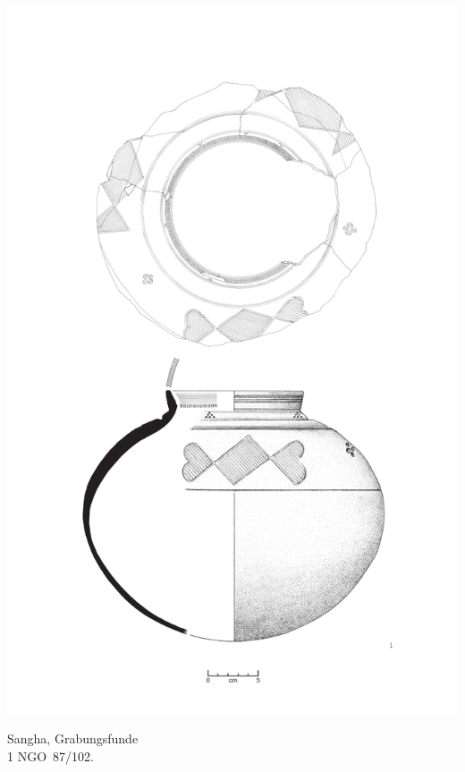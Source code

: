 \begin{pl}[H]
	\includegraphics{plt/Taf43.pdf}
	\vspace{.75em}\caption{\mbox{Sangha}, Grabungsfunde \\ 1 NGO~87/102.}
	\label{pl:43}
\end{pl}

